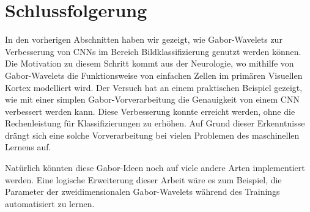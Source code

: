 \section{Schlussfolgerung}

In den vorherigen Abschnitten haben wir gezeigt, wie Gabor-Wavelets zur Verbesserung von CNNs im Bereich Bildklassifizierung genutzt werden können.
Die Motivation zu diesem Schritt kommt aus der Neurologie, wo mithilfe von Gabor-Wavelets die Funktionsweise von einfachen Zellen im primären Visuellen Kortex modelliert wird.
Der Versuch hat an einem praktischen Beispiel gezeigt, wie mit einer simplen Gabor-Vorverarbeitung die Genauigkeit von einem CNN verbessert werden kann.
Diese Verbesserung konnte erreicht werden, ohne die Rechenleistung für Klassifizierungen zu erhöhen.
Auf Grund dieser Erkenntnisse drängt sich eine solche Vorverarbeitung bei vielen Problemen des maschinellen Lernens auf. 

Natürlich könnten diese Gabor-Ideen noch auf viele andere Arten implementiert werden.
Eine logische Erweiterung dieser Arbeit wäre es zum Beispiel, die Parameter der zweidimensionalen Gabor-Wavelets während des Trainings automatisiert zu lernen.
